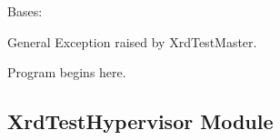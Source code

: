 \documentclass[a4paper,11pt,openany]{sphinxmanual}
\begin{document}

\begin{fulllineitems}
\label{ref-manual/XrdTestMaster:XrdTestMaster.XrdTestMasterException}
Bases: 

General Exception raised by XrdTestMaster.

\end{fulllineitems}


\begin{fulllineitems}
\label{ref-manual/XrdTestMaster:XrdTestMaster.main}
Program begins here.

\end{fulllineitems}



\subsection{XrdTestHypervisor Module}
\label{ref-manual/XrdTestHypervisor:xrdtesthypervisor-module}\label{ref-manual/XrdTestHypervisor::doc}\label{ref-manual/XrdTestHypervisor:module-XrdTestHypervisor}
\end{document}
